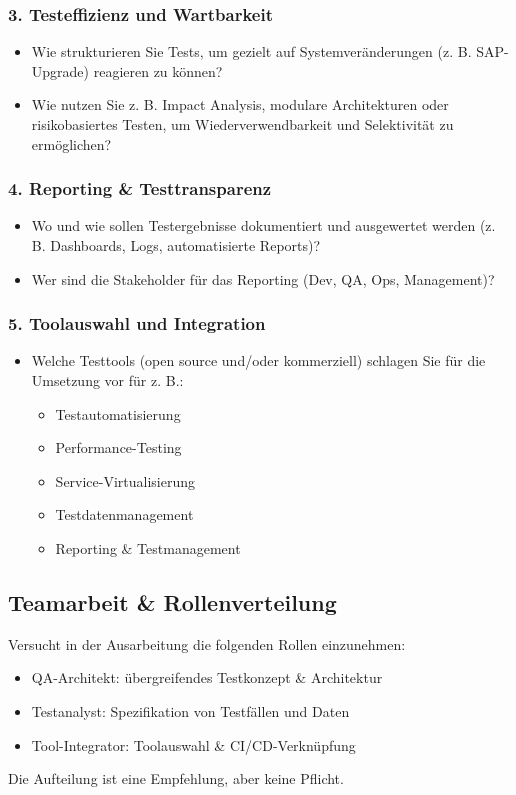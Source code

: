 \subsubsection{3. Testeffizienz und Wartbarkeit}
\begin{itemize}
    \item Wie strukturieren Sie Tests, um gezielt auf Systemveränderungen (z. B. SAP-Upgrade) reagieren zu können?
    \item Wie nutzen Sie z. B. Impact Analysis, modulare Architekturen oder risikobasiertes Testen, um Wiederverwendbarkeit und Selektivität zu ermöglichen?
\end{itemize}

\subsubsection{4. Reporting \& Testtransparenz}
\begin{itemize}
    \item Wo und wie sollen Testergebnisse dokumentiert und ausgewertet werden (z. B. Dashboards, Logs, automatisierte Reports)?
    \item Wer sind die Stakeholder für das Reporting (Dev, QA, Ops, Management)?
\end{itemize}

\subsubsection{5. Toolauswahl und Integration}
\begin{itemize}
    \item Welche Testtools (open source und/oder kommerziell) schlagen Sie für die Umsetzung vor für z. B.:
    \begin{itemize}
        \item Testautomatisierung
        \item Performance-Testing
        \item Service-Virtualisierung
        \item Testdatenmanagement
        \item Reporting \& Testmanagement
    \end{itemize}
\end{itemize}

\subsection{Teamarbeit \& Rollenverteilung}
Versucht in der Ausarbeitung die folgenden Rollen einzunehmen:
\begin{itemize}
    \item QA-Architekt: übergreifendes Testkonzept \& Architektur
    \item Testanalyst: Spezifikation von Testfällen und Daten
    \item Tool-Integrator: Toolauswahl \& CI/CD-Verknüpfung
\end{itemize}
Die Aufteilung ist eine Empfehlung, aber keine Pflicht.

